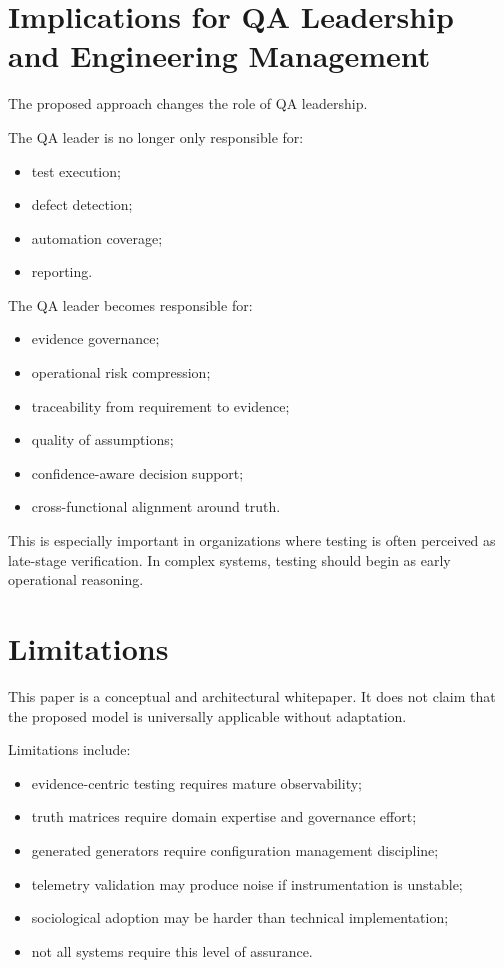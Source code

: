 \documentclass[11pt,a4paper]{article}
\begin{document}
\section{Implications for QA Leadership and Engineering Management}

The proposed approach changes the role of QA leadership.

The QA leader is no longer only responsible for:
\begin{itemize}
\item test execution;
\item defect detection;
\item automation coverage;
\item reporting.
\end{itemize}

The QA leader becomes responsible for:
\begin{itemize}
\item evidence governance;
\item operational risk compression;
\item traceability from requirement to evidence;
\item quality of assumptions;
\item confidence-aware decision support;
\item cross-functional alignment around truth.
\end{itemize}

This is especially important in organizations where testing is often perceived as late-stage verification. In complex systems, testing should begin as early operational reasoning.

\section{Limitations}

This paper is a conceptual and architectural whitepaper. It does not claim that the proposed model is universally applicable without adaptation.

Limitations include:
\begin{itemize}
\item evidence-centric testing requires mature observability;
\item truth matrices require domain expertise and governance effort;
\item generated generators require configuration management discipline;
\item telemetry validation may produce noise if instrumentation is unstable;
\item sociological adoption may be harder than technical implementation;
\item not all systems require this level of assurance.
\end{itemize}
\end{document}
